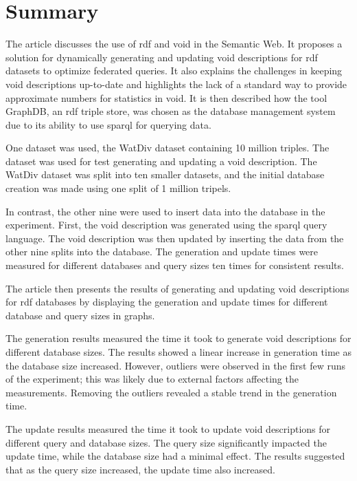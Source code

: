 \section{Summary}\label{sec:summary}
The article discusses the use of \gls{rdf} and \gls{void} in the Semantic Web. It proposes a solution for dynamically generating and updating \gls{void} descriptions for \gls{rdf} datasets to optimize federated queries. It also explains the challenges in keeping \gls{void} descriptions up-to-date and highlights the lack of a standard way to provide approximate numbers for statistics in \gls{void}. It is then described how the tool GraphDB, an \gls{rdf} triple store, was chosen as the database management system due to its ability to use \gls{sparql} for querying data.

One dataset was used, the WatDiv dataset containing 10 million triples. The dataset was used for test generating and updating a \gls{void} description. The WatDiv dataset was split into ten smaller datasets, and the initial database creation was made using one split of 1 million tripels.

In contrast, the other nine were used to insert data into the database in the experiment. First, the \gls{void} description was generated using the \gls{sparql} query language. The \gls{void} description was then updated by inserting the data from the other nine splits into the database. The generation and update times were measured for different databases and query sizes ten times for consistent results.

The article then presents the results of generating and updating \gls{void} descriptions for \gls{rdf} databases by displaying the generation and update times for different database and query sizes in graphs.

The generation results measured the time it took to generate \gls{void} descriptions for different database sizes. The results showed a linear increase in generation time as the database size increased. However, outliers were observed in the first few runs of the experiment; this was likely due to external factors affecting the measurements. Removing the outliers revealed a stable trend in the generation time.

The update results measured the time it took to update \gls{void} descriptions for different query and database sizes. The query size significantly impacted the update time, while the database size had a minimal effect. The results suggested that as the query size increased, the update time also increased.

